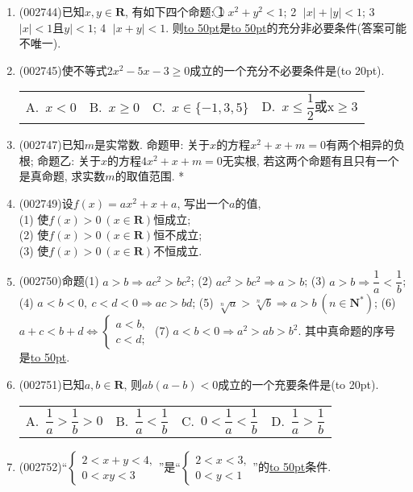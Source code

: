 \documentclass[10pt,a4paper]{article}
\newcommand{\blank}[1]{\underline{\hbox to #1pt{}}}
\newcommand{\bracket}[1]{(\hbox to #1pt{})}
\newcommand{\fourch}[4]{\par\begin{tabular}{p{.23\textwidth}p{.23\textwidth}p{.23\textwidth}p{.23\textwidth}}
A.~#1 &B.~#2& C.~#3& D.~#4
\end{tabular}}
\begin{document}
\begin{enumerate}[1.]
(1) 若$x,y\in \mathbf{R}$, 则$x^2+y^2 \ne 0$是``$x,y$不全为零''的\blank{50}条件;\\
(2) 若$x,y$$\in \mathbf{R}$, 则``$xy>0,x+y>0$''是``$x>0,y>0$'' 的\blank{50}条件;\\
(3) 设$a,b\in \mathbf{R}$, 则``$|a|+|b|=|a+b|$''是``$ab=0$''的\blank{50}条件;\\   
(4) 若$a,b,c$是常数, 则``$a>0$且$b^2-4ac<0$''是``对任意$x\in \mathbf{R}$, 有$ax^2+bx+c>0$''的\blank{50}条件;\\
(5) 设$a,b\in \mathbf{R},$则$b=\tan a$是$a=\arctan b$的\blank{50}条件.
\item {\tiny (002744)}已知$x,y\in \mathbf{R}$, 有如下四个命题: \textcircled{1} $x^2+y^2<1$; \textcircled{2} $|x|+|y|<1$; \textcircled{3} $|x|<1$且$y|<1$; \textcircled{4} $|x+y|<1$. 则\blank{50}是\blank{50}的充分非必要条件(答案可能不唯一).
\item {\tiny (002745)}使不等式$2x^2-5x-3\ge 0$成立的一个充分不必要条件是\bracket{20}. 
\fourch{$x<0$}{$x\ge 0$}{$x\in \{-1,3,5\}$}{$x\le \dfrac12$或x$\ge 3$}
\item {\tiny (002747)}已知$m$是实常数. 命题甲: 关于$x$的方程$x^2+x+m=0$有两个相异的负根; 命题乙: 关于$x$的方程$4x^2+x+m=0$无实根, 若这两个命题有且只有一个是真命题, 求实数$m$的取值范围.
*
\vspace*{16ex}
\item {\tiny (002749)}设$f(x)=ax^2+x+a$, 写出一个$a$的值,\\
(1) 使$f(x)>0\ (x\in \mathbf{R})$恒成立;\\
(2) 使$f(x)>0\ (x\in \mathbf{R})$恒不成立;\\
(3) 使$f(x)>0\ (x\in \mathbf{R})$不恒成立.
\item {\tiny (002750)}命题(1) $a>b\Rightarrow ac^2>bc^2$;   (2) $ac^2>bc^2\Rightarrow a>b$;     (3) $a>b\Rightarrow \dfrac 1a<\dfrac 1b$; (4) $a<b<0, \ c<d<0\Rightarrow ac>bd$;   (5) $\sqrt[n]a>\sqrt[n]b\Rightarrow a>b \ (n\in \mathbf{N}^*)$;    (6) $a+c<b+d\Leftrightarrow \begin{cases} a<b, \\ c<d; \end{cases}$ (7) $a<b<0\Rightarrow a^2>ab>b^2$. 其中真命题的序号是\blank{50}.
\item {\tiny (002751)}已知$a,b\in \mathbf{R}$, 则$ab(a-b)<0$成立的一个充要条件是\bracket{20}.
\fourch{$\dfrac 1a>\dfrac 1b>0$}{$\dfrac 1a<\dfrac 1b$}{$0<\dfrac 1a<\dfrac 1b$}{$\dfrac 1a>\dfrac 1b$}
\item {\tiny (002752)}``$\begin{cases} 2<x+y<4, \\ 0<xy<3 \end{cases}$''是``$\begin{cases} 2<x<3, \\ 0<y<1 \end{cases}$''的\blank{50}条件.
$$
\end{enumerate}
\end{document}
